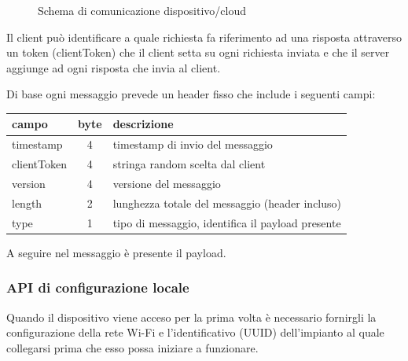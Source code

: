 \documentclass[a4paper,titlepage]{article}
\begin{document}
\begin{figure}[ht]
    \centering
    \caption{Schema di comunicazione dispositivo/cloud}
    \label{comunicazione_cloud}
\end{figure}

Il client può identificare a quale richiesta fa riferimento ad una risposta attraverso un
token (clientToken) che il client setta su ogni richiesta inviata e che il server aggiunge
ad ogni risposta che invia al client.

Di base ogni messaggio prevede un header fisso che include i seguenti campi:

\begin{center}
\begin{tabular}{| l | c | l |}
    \hline
    \textbf{campo} & \textbf{byte} & \textbf{descrizione} \\
    \hline
    timestamp & 4 & timestamp di invio del messaggio \\
    \hline
    clientToken & 4 & stringa random scelta dal client \\
    \hline
    version & 4 & versione del messaggio \\
    \hline
    length & 2 & lunghezza totale del messaggio (header incluso) \\
    \hline
    type & 1 & tipo di messaggio, identifica il payload presente \\
    \hline
\end{tabular}
\end{center}

A seguire nel messaggio è presente il payload.

\subsubsection{API di configurazione locale}

Quando il dispositivo viene acceso per la prima volta è necessario fornirgli la
configurazione della rete Wi-Fi e l'identificativo (UUID) dell'impianto al quale
collegarsi prima che esso possa iniziare a funzionare.
\end{document}
